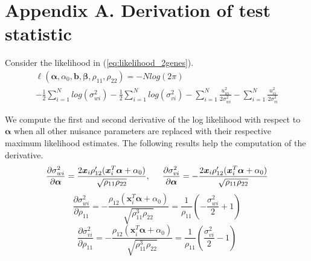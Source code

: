 \documentclass[aap,authoryear, preprint]{imsart}
\numberwithin{equation}{section}
\theoremstyle{plain}
\begin{document}


 
\pagebreak
 
\section*{Appendix A. Derivation of test statistic}
Consider the likelihood in (\ref{eq:likelihood_2genes}).
\begin{equation}
\begin{multlined}
\ell(\bm{\alpha}, \alpha_0, \bm{b}, \bm{\beta}, \rho_{11}, \rho_{22}) 
= -N log(2\pi) \\ - \frac{1}{2} \sum_{i=1}^{N} log(\sigma_{wi}^2) - \frac{1}{2} \sum_{i=1}^{N} log(\sigma_{vi}^2) - \sum_{i=1}^{N} \frac{u_{wi}^2}{2\sigma_{wi}^2} - \sum_{i=1}^{N} \frac{u_{vi}^2}{2\sigma_{vi}^2}
\end{multlined}
    \label{eq:likelihood_2genes_appendix}
\end{equation}

We compute the first and second derivative of the log likelihood with respect to $\bm{\alpha}$ when all other nuisance parameters are replaced with their respective maximum likelihood estimates. The following results help the computation of the derivative.
$$
\frac{\partial \sigma_{wi}^2}{\partial \bm{\alpha}} = \frac{2\bm{x}_i \rho_{12}'(\bm{x}_i^T \bm{\alpha} + \alpha_0)}{\sqrt{\rho_{11}\rho_{22}}}, \hspace{5mm}
\frac{\partial \sigma_{vi}^2}{\partial \bm{\alpha}} = -\frac{2\bm{x}_i \rho_{12}'(\bm{x}_i^T \bm{\alpha} + \alpha_0)}{\sqrt{\rho_{11}\rho_{22}}}
$$
$$\frac{\partial \sigma_{wi}^2}{\partial \rho_{11}} = -\frac{\rho_{12}(\bm{x}_i^T\bm{\alpha} + \alpha_0)}{\sqrt{\rho_{11}^3\rho_{22}}} = \frac{1}{\rho_{11}}\left(-\frac{\sigma_{wi}^2}{2} + 1\right)$$
$$\frac{\partial \sigma_{vi}^2}{\partial \rho_{11}} = -\frac{\rho_{12}(\bm{x}_i^T\bm{\alpha} + \alpha_0)}{\sqrt{\rho_{11}^3\rho_{22}}} = \frac{1}{\rho_{11}}\left(\frac{\sigma_{vi}^2}{2} - 1\right)$$
\end{document}

